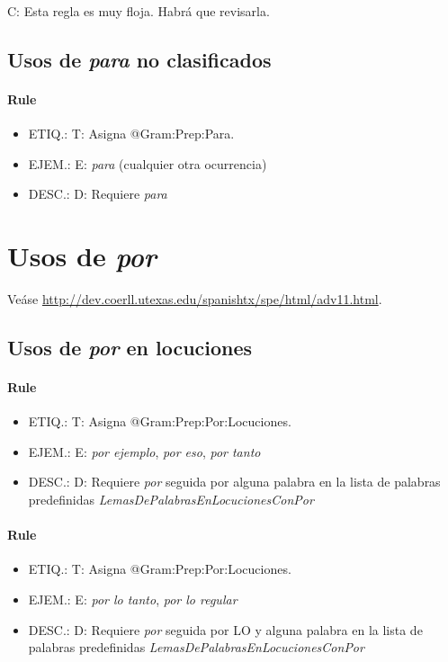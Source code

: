 \documentclass[11pt]{report}
\begin{document}
 C: Esta regla es muy floja. Habrá que revisarla.
\subsection{Usos de \emph{para} no clasificados}
\paragraph*{Rule}
\begin{itemize}
\item ETIQ.:  T: Asigna @Gram:Prep:Para.
\item EJEM.:  E: \emph{para} (cualquier otra ocurrencia)
\item DESC.:  D: Requiere \emph{para}
\end{itemize}

\section{Usos de \emph{por}}
Veáse \url{http://dev.coerll.utexas.edu/spanishtx/spe/html/adv11.html}.

\subsection{Usos de \emph{por} en locuciones}
\paragraph*{Rule}
\begin{itemize}
\item ETIQ.:  T: Asigna @Gram:Prep:Por:Locuciones.
\item EJEM.:  E: \emph{por ejemplo}, \emph{por eso}, \emph{por tanto}
\item DESC.:  D: Requiere \emph{por} seguida por alguna palabra en la lista de palabras predefinidas \emph{LemasDePalabrasEnLocucionesConPor}
\end{itemize}

\paragraph*{Rule}
\begin{itemize}
\item ETIQ.:  T: Asigna @Gram:Prep:Por:Locuciones.
\item EJEM.:  E: \emph{por lo tanto}, \emph{por lo regular}
\item DESC.:  D: Requiere \emph{por} seguida por LO y alguna palabra en la lista de palabras predefinidas \emph{LemasDePalabrasEnLocucionesConPor}
\end{itemize}
\end{document}

